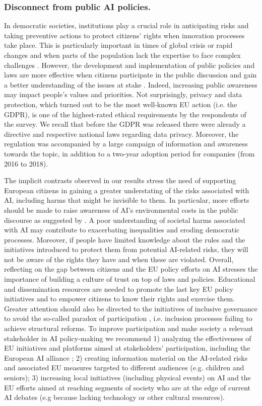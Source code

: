 \documentclass{article}
\begin{document}
\subsubsection{\textbf{Disconnect from public AI policies}.}
 In democratic societies, institutions play a crucial role in anticipating risks and taking preventive actions to protect citizens' rights when innovation processes take place. This is particularly important in times of global crisis or rapid changes and when parts of the population lack the expertise to face complex challenges \cite{zwitter2012rule}. However, the development and implementation of public policies and laws are more effective when citizens participate in the public discussion and gain a better understanding of the issues at stake \cite{funk2009public}. Indeed, increasing public awareness may impact people's values and priorities. Not surprisingly, privacy and data protection, which turned out to be the most well-known EU action (i.e. the GDPR), is one of the highest-rated ethical requirements by the respondents of the survey. We recall that before the GDPR was released there were already a directive and respective national laws regarding data privacy. Moreover, the regulation was accompanied by a large campaign of information and awareness towards the topic, in addition to a two-year adoption period for companies (from 2016 to 2018). 
 
 The implicit contrasts observed in our results stress the need of supporting European citizens in gaining a greater understating of the risks associated with AI, including harms that might be invisible to them. In particular, more efforts should be made to raise awareness of AI’s environmental costs in the public discourse as suggested by \cite{brevini2020black}. A poor understanding of societal harms associated with AI may contribute to exacerbating inequalities and eroding democratic processes. Moreover, if people have limited knowledge about the rules and the initiatives introduced to protect them from potential AI-related risks, they will not be aware of the rights they have and when these are violated. Overall, reflecting on the gap between citizens and the EU policy efforts on AI stresses the importance of building a culture of trust on top of laws and policies. Educational and dissemination resources are needed to promote the last key EU policy initiatives and to empower citizens to know their rights and exercise them. Greater attention should also be directed to the initiatives of inclusive governance to avoid the so-called paradox of participation \cite{cleaver1999paradoxes, png2022tensions}, i.e. inclusion processes failing to achieve structural reforms.
 To improve participation and make society a relevant stakeholder in AI policy-making we recommend 1) analyzing the effectiveness of EU initiatives and platforms aimed at  stakeholders' participation, including the European AI alliance \cite{AIAlliance}; 2) creating information material on the AI-related risks and associated EU measures targeted to different audiences (e.g. children and seniors); 3) increasing local initiatives (including physical events) on AI and the EU efforts aimed at reaching segments of society who are at the edge of current AI debates (e.g because lacking technology or other cultural resources).
\end{document}
